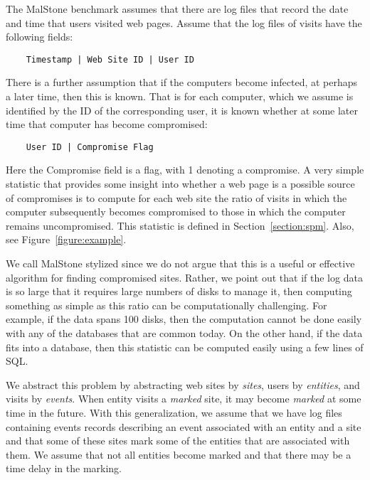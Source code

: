 \documentclass{acm_proc_article-sp}
\def\malstone{MalStone } \def\malgen{MalGen }
\begin{document}
The \malstone benchmark assumes that there are log files that record
the date and time that users visited web pages. Assume that the log
files of visits have the following fields:
\begin{verbatim}
    Timestamp | Web Site ID | User ID
\end{verbatim}
There is a further assumption that if the computers become infected,
at perhaps a later time, then this is known. That is for each
computer, which we assume is identified by the ID of the corresponding
user, it is known whether at some later time that computer has become
compromised:
\begin{verbatim}
    User ID | Compromise Flag
\end{verbatim}

Here the Compromise field is a flag, with 1 denoting a compromise. A very simple statistic that provides some insight into whether a web page is a possible source of compromises is to compute for each web site the ratio of visits in which the computer subsequently becomes compromised to those in which the computer remains uncompromised.  This statistic is defined in Section~\ref{section:spm}.  Also, see Figure~\ref{figure:example}.

We call \malstone stylized since we do not argue that this is a useful
or effective algorithm for finding compromised sites. Rather, we point
out that if the log data is so large that it requires large numbers of
disks to manage it, then computing something as simple as this ratio
can be computationally challenging. For example, if the data spans 100
disks, then the computation cannot be done easily with any of the
databases that are common today. On the other hand, if the data fits
into a database, then this statistic can be computed easily using a
few lines of SQL.

We abstract this problem by abstracting web sites by {\em sites},
users by {\em entities}, and visits by {\em events}.  
When entity visits a {\em marked} site, it may become {\em marked}
at some time in the future.  With this
generalization, we assume that we have log files containing
events records describing an event associated with an entity and a site
and that some of these sites mark some of the entities that
are associated with them.  We assume that not all entities become
marked and that there may be a time delay in the marking.
\end{document}
